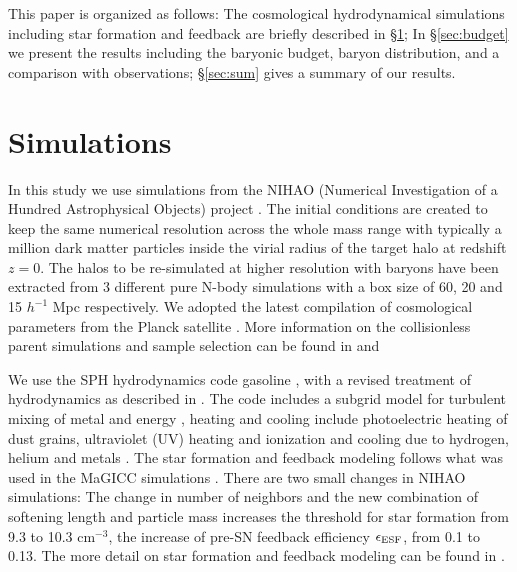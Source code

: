 \documentclass[useAMS,usenatbib]{mn2e}
\begin{document}
This paper is organized as follows: The cosmological hydrodynamical
simulations including star formation and feedback are briefly
described in  \S\ref{sec:sims}; In \S\ref{sec:budget} we present the
results including the baryonic budget, baryon distribution, and a
comparison with observations; \S\ref{sec:sum} gives a summary of our
results.




\section{Simulations} 
\label{sec:sims}

In this study we use simulations from the NIHAO (Numerical
Investigation of a Hundred Astrophysical Objects) project \citep{Wang15}.  
The initial conditions are created to keep the same numerical
resolution across the whole mass range with typically a million dark
matter particles inside the virial radius of the target halo at 
redshift $z=0$.  The halos to be re-simulated at higher resolution
with baryons have been extracted from 3 different pure N-body
simulations with a box size of 60, 20 and 15 $h^{-1}$ Mpc
respectively.  We adopted the  latest compilation of cosmological
parameters from the Planck  satellite \citep{Planck14}. 
More information on the collisionless parent simulations and
sample  selection can be found in \citet{Dutton14} and \citet{Wang15}

We use the SPH hydrodynamics code {\sc gasoline} \citep{Wadsley04},
with a revised treatment of  hydrodynamics as described in
\citet{Keller14}.  The code includes a subgrid model for turbulent
mixing of metal and energy \citep{Wadsley08}, heating and cooling
include photoelectric heating of dust grains, ultraviolet (UV) heating
and ionization and  cooling due to hydrogen, helium and metals
\citep{Shen10}.  The star formation and feedback modeling follows what
was used in the MaGICC simulations \citep{Stinson13}.  There are two
small changes in NIHAO simulations: The change in  number of neighbors
and the new combination of softening length and  particle mass increases
the threshold for star formation from  9.3 to 10.3
cm$^{-3}$, the increase of pre-SN feedback efficiency $\epsilon_{\rm
  ESF}$, from 0.1 to 0.13.  The more detail on star formation and
feedback modeling can be found in \citet{Wang15}.
\end{document}
